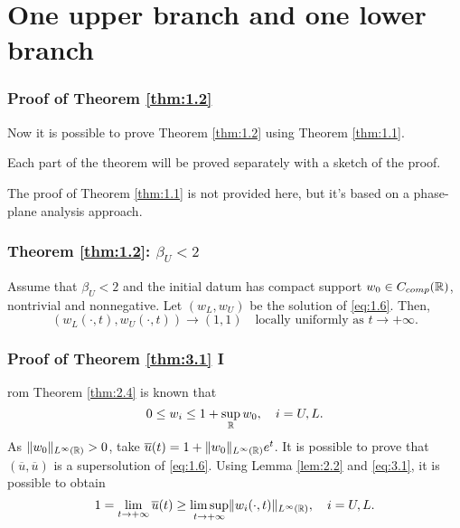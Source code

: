 \section{One upper branch and one lower branch}


\begin{frame}
    \frametitle{Proof of Theorem \ref{thm:1.2}}
    Now it is possible to prove Theorem \ref{thm:1.2} using Theorem \ref{thm:1.1}.
    
    Each part of the theorem will be proved separately with a sketch of the proof.

    The proof of Theorem \ref{thm:1.1} is not provided here, but it's based on a phase-plane analysis approach.

\end{frame}


\begin{frame}
    \frametitle{Theorem \ref{thm:1.2}: \texorpdfstring{\(\beta_U < 2\)}{betaU < 2}}
    \begin{theorem}
        Assume that \(\beta_U < 2\) and the initial datum has compact support \(w_{0} \in C_{comp}(\mathbb{R})\), nontrivial and nonnegative. Let \((w_L, w_{U})\) be the solution of \eqref{eq:1.6}. Then,
        \[
            (w_L(\cdot, t), w_{U}(\cdot, t)) \to (1, 1) \quad \text{locally uniformly as } t \to +\infty.
        \]
        \label{thm:3.1} 
    \end{theorem}
\end{frame}


\begin{frame}
    \frametitle{Proof of Theorem \ref{thm:3.1} I}
    \begin{proofs}
        rom Theorem \ref{thm:2.4} is known that 
    \begin{equation}
        0 \leq w_{i} \leq 1 + \sup_{\mathbb{R}} w_{0}, \quad i = U, L.
        \label{eq:3.1}
    \end{equation}
    As \(\lVert w_{0}\rVert_{L^{\infty}(\mathbb{R})} > 0\), take \(\overline{u}(t) = 1 + \lVert w_{0}\rVert_{L^{\infty}(\mathbb{R})}e^{t}\). 
    It is possible to prove that \((\overline{u}, \overline{u})\) is a supersolution of \eqref{eq:1.6}. Using Lemma \ref{lem:2.2} and \eqref{eq:3.1}, it is possible to obtain 
    \begin{equation}
        1 = \lim_{t \to +\infty} \overline{u}(t) \geq \limsup_{t \to +\infty} \lVert w_i(\cdot, t)\rVert_{L^{\infty}(\mathbb{R})}, \quad i = U, L.
        \label{eq:3.2}
    \end{equation}
    \end{proofs}
\end{frame}

